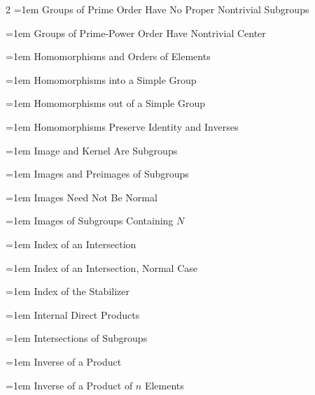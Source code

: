 \documentclass[11pt]{report}
\begin{document}
\begin{multicols}{2}
\noindent\hangindent=1em Groups of Prime Order Have No Proper Nontrivial Subgroups\dotfill \pageref{cor:groups-prime-order-have-no-proper-nontrivial}\par
\noindent\hangindent=1em Groups of Prime-Power Order Have Nontrivial Center\dotfill \pageref{thm:groups-prime-power-order-have-nontrivial-center}\par
\noindent\hangindent=1em Homomorphisms and Orders of Elements\dotfill \pageref{prop:homomorphisms-orders-elements}\par
\noindent\hangindent=1em Homomorphisms into a Simple Group\dotfill \pageref{prop:homomorphisms-into-simple-group}\par
\noindent\hangindent=1em Homomorphisms out of a Simple Group\dotfill \pageref{prop:homomorphisms-out-simple-group}\par
\noindent\hangindent=1em Homomorphisms Preserve Identity and Inverses\dotfill \pageref{prop:homomorphisms-preserve-identity-inverses}\par
\noindent\hangindent=1em Image and Kernel Are Subgroups\dotfill \pageref{prop:image-kernel-subgroups}\par
\noindent\hangindent=1em Images and Preimages of Subgroups\dotfill \pageref{prop:images-preimages-subgroups}\par
\noindent\hangindent=1em Images Need Not Be Normal\dotfill \pageref{prop:images-need-not-normal}\par
\noindent\hangindent=1em Images of Subgroups Containing $N$\dotfill \pageref{prop:images-subgroups-containing-n}\par
\noindent\hangindent=1em Index of an Intersection\dotfill \pageref{prop:index-intersection}\par
\noindent\hangindent=1em Index of an Intersection, Normal Case\dotfill \pageref{cor:index-intersection-normal}\par
\noindent\hangindent=1em Index of the Stabilizer\dotfill \pageref{cor:index-stabilizer}\par
\noindent\hangindent=1em Internal Direct Products\dotfill \pageref{lem:internal-direct-product}\par
\noindent\hangindent=1em Intersections of Subgroups\dotfill \pageref{prop:intersections-subgroups}\par
\noindent\hangindent=1em Inverse of a Product\dotfill \pageref{prop:inverse-product}\par
\noindent\hangindent=1em Inverse of a Product of $n$ Elements\dotfill \pageref{cor:inverse-product-n-elements}\par

\end{multicols}
\end{document}
